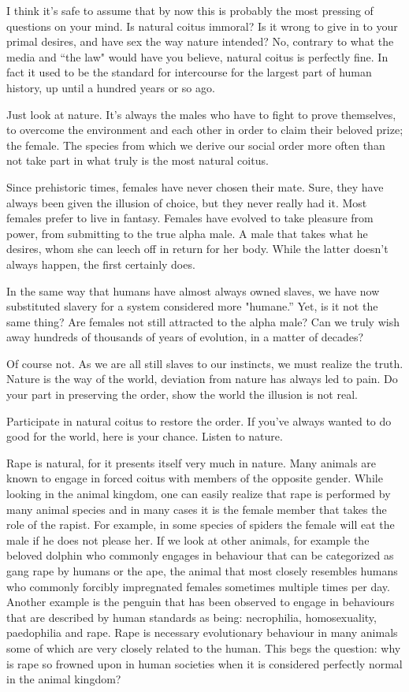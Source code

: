 I think it's safe to assume that by now this is probably the most pressing of 
questions on your mind. Is natural coitus immoral? Is it wrong to give in to 
your primal desires, and have sex the way nature intended? No, contrary to what 
the media and ``the law" would have you believe, natural coitus is perfectly 
fine. In fact it used to be the standard for intercourse for the largest part of 
human history, up until a hundred years or so ago.


Just look at nature. It's always the males who have to fight to prove 
themselves, to overcome the environment and each other in order to claim their 
beloved prize; the female. The species from which we derive our social order 
more often than not take part in what truly is the most natural coitus.


Since prehistoric times, females have never chosen their mate. Sure, they have 
always been given the illusion of choice, but they never really had it. Most 
females prefer to live in fantasy. Females have evolved to take pleasure from 
power, from submitting to the true alpha male. A male that takes what he 
desires, whom she can leech off in return for her body. While the latter doesn't 
always happen, the first certainly does.


In the same way that humans have almost always owned slaves, we have now 
substituted slavery for a system considered more "humane.” Yet, is it not the 
same thing? Are females not still attracted to the alpha male? Can we truly wish 
away hundreds of thousands of years of evolution, in a matter of decades?


Of course not. As we are all still slaves to our instincts, we must realize the 
truth. Nature is the way of the world, deviation from nature has always led to 
pain. Do your part in preserving the order, show the world the illusion is not 
real.


Participate in natural coitus to restore the order. If you've always wanted to 
do good for the world, here is your chance. Listen to nature.



Rape is natural, for it presents itself very much in nature. Many animals are 
known to engage in forced coitus with members of the opposite gender. While 
looking in the animal kingdom, one can easily realize that rape is performed by 
many animal species and in many cases it is the female member that takes the 
role of the rapist. For example, in some species of spiders the female will eat 
the male if he does not please her. If we look at other animals, for example the 
beloved dolphin who commonly engages in behaviour that can be categorized as 
gang rape by humans or the ape, the animal that most closely resembles humans 
who commonly forcibly impregnated females sometimes multiple times per day. 
Another example is the penguin that has been observed to engage in behaviours 
that are described by human standards as being: necrophilia, homosexuality, 
paedophilia and rape. Rape is necessary evolutionary behaviour in many animals 
some of which are very closely related to the human. This begs the question: why 
is rape so frowned upon in human societies when it is considered perfectly 
normal in the animal kingdom?



